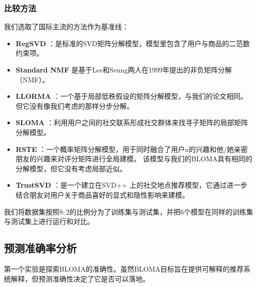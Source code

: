 \subsubsection{比较方法}
我们选取了国际主流的方法作为基准线：
\begin{itemize}
\item \textbf{RegSVD} \cite{paterek2007improving}：是标准的SVD矩阵分解模型，模型里包含了用户与商品的二范数约束项。
\item \textbf{Standard NMF} 是基于Lee和Seung\cite{NMF}两人在1999年提出的非负矩阵分解（NMF）。
\item \textbf{LLORMA} \cite{lee2013local,zhang2017local}：一个基于局部低秩假设的矩阵分解模型，与我们的论文相同。但它没有像我们考虑的那样分步分解。

\item \textbf{SLOMA} \cite{yang2017social}：利用用户之间的社交联系形成社交群体来找寻子矩阵的局部矩阵分解模型。

\item \textbf{RSTE} \cite{ma2011learning}：一个概率矩阵分解模型，用于同时融合了用户$u$的兴趣和他/她亲密朋友的兴趣来对评分矩阵进行全局建模。 该模型与我们的BLOMA具有相同的分解模型，但它没有考虑局部近似。
\item \textbf{TrustSVD} \cite{guo2016novel}：是一个建立在SVD++ \cite{koren2008factorization}上的社交地点推荐模型，它通过进一步结合朋友对用户关于商品喜好的显式和隐性影响来建模。
\end{itemize}
我们将数据集按照$8:2$的比例分为了训练集与测试集，并把6个模型在同样的训练集与测试集上进行运行和对比。

\subsection{预测准确率分析}
第一个实验是探索BLOMA的准确性。虽然BLOMA目标旨在提供可解释的推荐系统解释，但预测准确性决定了它是否可以落地。

